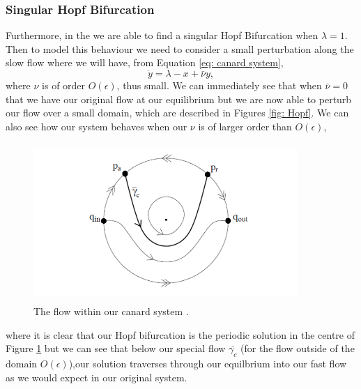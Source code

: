 \subsubsection{Singular Hopf Bifurcation}\label{sec:singular-hopf-bifurcation}
Furthermore, in the \vdp we are able to find a singular Hopf Bifurcation when $ \lambda=1 $. Then to model this behaviour we need to consider a small perturbation along the slow flow where we will have, from Equation \ref{eq: canard system},%
\begin{equation}
\dot{y}=\lambda-x+\bar{\nu} y,
\end{equation}
where $ \nu $ is of order $ O(\epsilon) $, thus small. We can immediately see that when $ \bar{\nu}=0 $ that we have our original flow at our equilibrium but we are now able to perturb our flow over a small domain, which are described in Figures \ref{fig: Hopf}. We can also see how our system behaves when our $ \nu $ is of larger order than $ O(\epsilon) $,

\begin{figure}[h]\centering
	\includegraphics[height=6cm,width=10cm]{Images/CanardPointcircle}
	\caption{The flow within our canard system \citep{krupa2001}.}
	\label{fig: canard flow circle}
\end{figure}\newpage
where it is clear that our Hopf bifurcation is the periodic solution in the centre of Figure \ref{fig: canard flow circle} but we can see that below our special flow $ \bar{\gamma_c} $ (for the flow outside of the domain $ O(\epsilon) $),our solution traverses through our equilbrium into our fast flow as we would expect in our original system.


